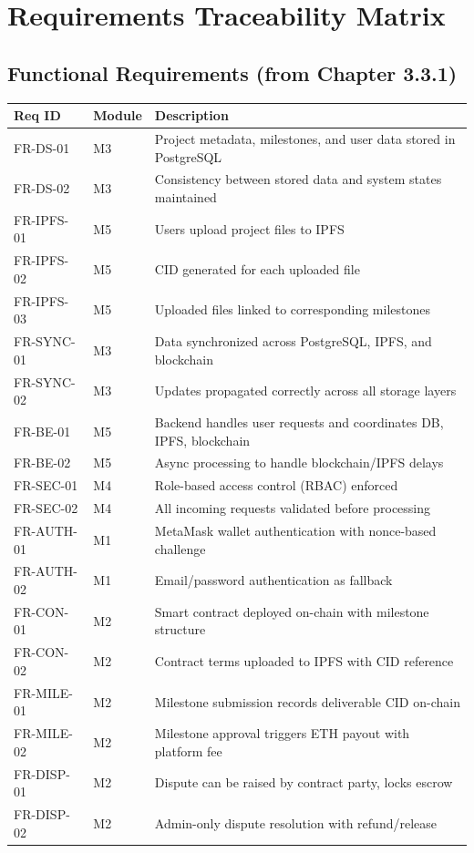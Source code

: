 \documentclass[12pt,a4paper]{article}
\begin{document}
\tableofcontents
\newpage

\section{Requirements Traceability Matrix}

\subsection{Functional Requirements (from Chapter 3.3.1)}

\begin{tabularx}{\textwidth}{llX}
\toprule
\textbf{Req ID} & \textbf{Module} & \textbf{Description} \\
\midrule
FR-DS-01 & M3 & Project metadata, milestones, and user data stored in PostgreSQL \\
FR-DS-02 & M3 & Consistency between stored data and system states maintained \\
FR-IPFS-01 & M5 & Users upload project files to IPFS \\
FR-IPFS-02 & M5 & CID generated for each uploaded file \\
FR-IPFS-03 & M5 & Uploaded files linked to corresponding milestones \\
FR-SYNC-01 & M3 & Data synchronized across PostgreSQL, IPFS, and blockchain \\
FR-SYNC-02 & M3 & Updates propagated correctly across all storage layers \\
FR-BE-01 & M5 & Backend handles user requests and coordinates DB, IPFS, blockchain \\
FR-BE-02 & M5 & Async processing to handle blockchain/IPFS delays \\
FR-SEC-01 & M4 & Role-based access control (RBAC) enforced \\
FR-SEC-02 & M4 & All incoming requests validated before processing \\
FR-AUTH-01 & M1 & MetaMask wallet authentication with nonce-based challenge \\
FR-AUTH-02 & M1 & Email/password authentication as fallback \\
FR-CON-01 & M2 & Smart contract deployed on-chain with milestone structure \\
FR-CON-02 & M2 & Contract terms uploaded to IPFS with CID reference \\
FR-MILE-01 & M2 & Milestone submission records deliverable CID on-chain \\
FR-MILE-02 & M2 & Milestone approval triggers ETH payout with platform fee \\
FR-DISP-01 & M2 & Dispute can be raised by contract party, locks escrow \\
FR-DISP-02 & M2 & Admin-only dispute resolution with refund/release \\
\bottomrule
\end{tabularx}
\end{document}

